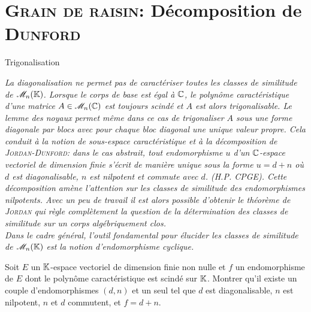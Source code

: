 \section{\textsc{Grain de raisin:} Décomposition de \textsc{Dunford}}

\begin{Large}
    Trigonalisation
\end{Large}

\textsl{La diagonalisation ne permet pas de caractériser toutes les classes de similitude de $\mathscr{M}_n(\mathbb{K})$. Lorsque le corps de base est égal à $\mathbb{C}$, le polynôme caractéristique d'une matrice $A \in \mathscr{M}_n(\mathbb{C})$ est toujours scindé et $A$ est alors trigonalisable. Le lemme des noyaux permet même dans ce cas de trigonaliser $A$ sous une forme diagonale par blocs avec pour chaque bloc diagonal une unique valeur propre. Cela conduit à la notion de sous-espace caractéristique et à la décomposition de \textsc{Jordan}-\textsc{Dunford}: dans le cas abstrait, tout endomorphisme $u$ d'un $\mathbb{C}$-espace vectoriel de dimension finie s'écrit de manière unique sous la forme $u = d + n$ où $d$ est diagonalisable, $n$ est nilpotent et commute avec $d$. (H.P. CPGE). Cette décomposition amène l'attention sur les classes de similitude des endomorphismes nilpotents. Avec un peu de travail il est alors possible d'obtenir le théorème de \textsc{Jordan} qui règle complètement la question de la détermination des classes de similitude sur un corps algébriquement clos. \\
Dans le cadre général, l'outil fondamental pour élucider les classes de similitude de $\mathscr{M}_n(\mathbb{K})$ est la notion d'endomorphisme cyclique.
}

\begin{exercice}
    Soit $E$ un $\mathbb{K}$-espace vectoriel de dimension finie non nulle et $f$ un endomorphisme de $E$ dont le polynôme caractéristique est scindé sur $\mathbb{K}$.
    Montrer qu’il existe un couple d’endomorphismes $(d, n)$ et un seul tel que $d$ est diagonalisable, $n$ est nilpotent, $n$ et $d$ commutent, et $f = d + n$.
\end{exercice}


